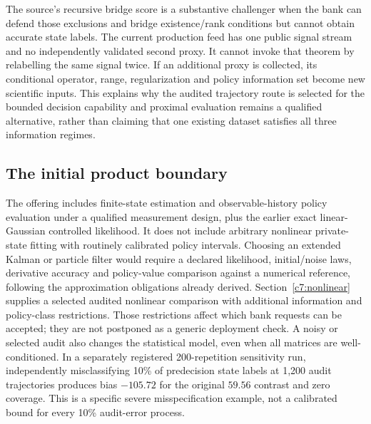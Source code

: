 The source's recursive bridge score is a substantive challenger when the
bank can defend those exclusions and bridge existence/rank conditions but
cannot obtain accurate state labels. The current production feed has one
public signal stream and no independently validated second proxy. It cannot
invoke that theorem by relabelling the same signal twice. If an additional
proxy is collected, its conditional operator, range, regularization and
policy information set become new scientific inputs. This explains why the
audited trajectory route is selected for the bounded decision capability
and proximal evaluation remains a qualified alternative, rather than
claiming that one existing dataset satisfies all three information regimes.

\subsection{The initial product boundary}
The offering includes finite-state estimation and observable-history policy
evaluation under a qualified measurement design, plus the earlier exact
linear-Gaussian controlled likelihood. It does not include arbitrary nonlinear
private-state fitting with routinely calibrated policy intervals. Choosing
an extended Kalman or particle filter would require a declared likelihood,
initial/noise laws, derivative accuracy and policy-value comparison against
a numerical reference, following the approximation obligations already
derived. Section~\ref{c7:nonlinear} supplies a selected audited nonlinear
comparison with additional information and policy-class restrictions.
Those restrictions affect which bank requests can be accepted; they are
not postponed as a generic deployment check. A noisy or selected audit
also changes the statistical model, even when all matrices are well-conditioned.
In a separately registered 200-repetition sensitivity run, independently
misclassifying 10\% of predecision state labels at 1,200 audit trajectories
produces bias $-105.72$ for the original $59.56$ contrast and zero coverage.
This is a specific severe misspecification example, not a calibrated bound
for every 10\% audit-error process.
